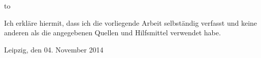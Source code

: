 \thispagestyle{empty}
\vspace*{42\baselineskip}
\hbox to \textwidth{\hrulefill}
\par
Ich erkläre hiermit, dass ich die vorliegende Arbeit selbständig verfasst und
keine anderen als die angegebenen Quellen und Hilfsmittel verwendet habe.

Leipzig, den 04. November  2014

\clearpage






